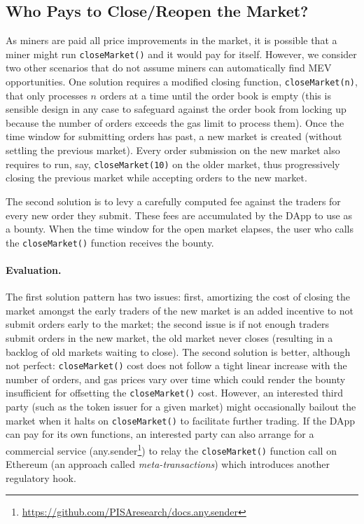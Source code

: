 
\subsection{Who Pays to Close/Reopen the Market?}
\label{sec:close}

As miners are paid all price improvements in the market, it is possible that a miner might run \texttt{closeMarket()} and it would pay for itself. However, we consider two other scenarios that do not assume miners can automatically find MEV opportunities. One solution requires a modified closing function, \texttt{closeMarket(n)}, that only processes $n$ orders at a time until the order book is empty (this is sensible design in any case to safeguard against the order book from locking up because the number of orders exceeds the gas limit to process them).  Once the time window for submitting orders has past, a new market is created (without settling the previous market). Every order submission on the new market also requires to run, say, \texttt{closeMarket(10)} on the older market, thus progressively closing the previous market while accepting orders to the new market.

The second solution is to levy a carefully computed fee against the traders for every new order they submit. These fees are accumulated by the DApp to use as a bounty. When the time window for the open market elapses, the user who calls the \texttt{closeMarket()} function receives the bounty.

\paragraph{Evaluation.} The first solution pattern has two issues: first, amortizing the cost of closing the market amongst the early traders of the new market is an added incentive to not submit orders early to the market; the second issue is if not enough traders submit orders in the new market, the old market never closes (resulting in a backlog of old markets waiting to close). The second solution is better, although not perfect: \texttt{closeMarket()} cost does not follow a tight linear increase with the number of orders, and gas prices vary over time which could render the bounty insufficient for offsetting the \texttt{closeMarket()} cost. However, an interested third party (such as the token issuer for a given market) might occasionally bailout the market when it halts on \texttt{closeMarket()} to facilitate further trading. If the DApp can pay for its own functions, an interested party can also arrange for a commercial service (\eg any.sender\footnote{\url{https://github.com/PISAresearch/docs.any.sender}}) to relay the \texttt{closeMarket()} function call on Ethereum (an approach called \textit{meta-transactions}) which introduces another regulatory hook.

